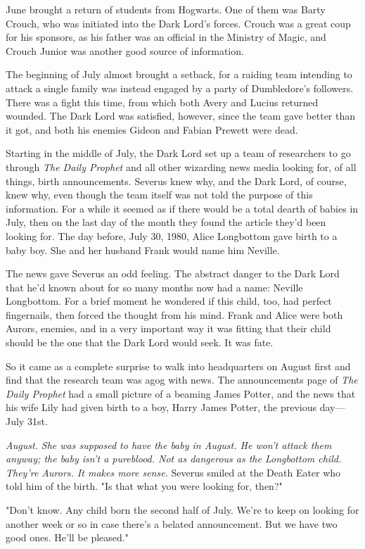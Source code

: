 June brought a return of students from Hogwarts. One of them was Barty Crouch, who was initiated into the Dark Lord's forces. Crouch was a great coup for his sponsors, as his father was an official in the Ministry of Magic, and Crouch Junior was another good source of information.

The beginning of July almost brought a setback, for a raiding team intending to attack a single family was instead engaged by a party of Dumbledore's followers. There was a fight this time, from which both Avery and Lucius returned wounded. The Dark Lord was satisfied, however, since the team gave better than it got, and both his enemies Gideon and Fabian Prewett were dead.

Starting in the middle of July, the Dark Lord set up a team of researchers to go through \emph{The Daily Prophet} and all other wizarding news media looking for, of all things, birth announcements. Severus knew why, and the Dark Lord, of course, knew why, even though the team itself was not told the purpose of this information. For a while it seemed as if there would be a total dearth of babies in July, then on the last day of the month they found the article they'd been looking for. The day before, July 30, 1980, Alice Longbottom gave birth to a baby boy. She and her husband Frank would name him Neville.

The news gave Severus an odd feeling. The abstract danger to the Dark Lord that he'd known about for so many months now had a name: Neville Longbottom. For a brief moment he wondered if this child, too, had perfect fingernails, then forced the thought from his mind. Frank and Alice were both Aurors, enemies, and in a very important way it was fitting that their child should be the one that the Dark Lord would seek. It was fate.

So it came as a complete surprise to walk into headquarters on August first and find that the research team was agog with news. The announcements page of \emph{The Daily Prophet} had a small picture of a beaming James Potter, and the news that his wife Lily had given birth to a boy, Harry James Potter, the previous day—July 31st.

\emph{August. She was supposed to have the baby in August. He won't attack them anyway; the baby isn't a pureblood. Not as dangerous as the Longbottom child. They're Aurors. It makes more sense.} Severus smiled at the Death Eater who told him of the birth. "Is that what you were looking for, then?"

"Don't know. Any child born the second half of July. We're to keep on looking for another week or so in case there's a belated announcement. But we have two good ones. He'll be pleased."

